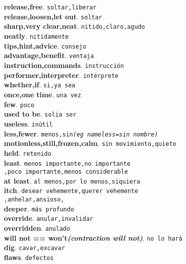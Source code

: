 \documentclass[twocolumn]{article}
\begin{document}
	\textsf{\textbf{release,free}}. \texttt{soltar,liberar}\\
	\textsf{\textbf{release,loosen,let out}}. \texttt{soltar}\\
	\textsf{\textbf{sharp,very clear,neat}}. \texttt{nitido,claro,agudo}\\
	\textsf{\textbf{neatly}}. \texttt{nitidamente}\\
	\textsf{\textbf{tips,hint,advice}}. \texttt{consejo}\\
	\textsf{\textbf{advantage,benefit}}. \texttt{ventaja}\\
	\textsf{\textbf{instruction,commands}}. \texttt{instrucci\'on}\\
	\textsf{\textbf{performer,interpreter}}. \texttt{int\'erprete}\\
	\textsf{\textbf{whether,if}}. \texttt{si,ya sea}\\
	\textsf{\textbf{once,one time}}. \texttt{una vez}\\
	\textsf{\textbf{few}}. \texttt{poco}\\
	\textsf{\textbf{used to be}}. \texttt{solia ser}\\
	\textsf{\textbf{useless}}. \texttt{in\'util}\\
	\textsf{\textbf{less,fewer}}. \texttt{menos,sin{\scriptsize \textit{(eg nameless=sin nombre)}}}\\
	\textsf{\textbf{motionless,still,frozen,calm}}. \texttt{sin movimiento,quieto}\\
	\textsf{\textbf{held}}. \texttt{retenido}\\
	\textsf{\textbf{least}}. \texttt{menos importante,no importante\\,poco importante,menos considerable}\\
	\textsf{\textbf{at least}}. \texttt{al menos,por lo menos,siquiera}\\
	\textsf{\textbf{itch}}. \texttt{desear vehemente,querer vehemente\\,anhelar,ansioso,}\\
	\textsf{\textbf{deeper}}. \texttt{m\'as profundo}\\
	\textsf{\textbf{override}}. \texttt{anular,invalidar}\\
	\textsf{\textbf{overridden}}. \texttt{anulado}\\
	\textsf{\textbf{will not == won't{\scriptsize \textit{(contraction will not)}}}}. \texttt{no lo har\'a}\\
	\textsf{\textbf{dig}}. \texttt{cavar,excavar}\\
	\textsf{\textbf{flaws}}. \texttt{defectos}\\
\end{document}
